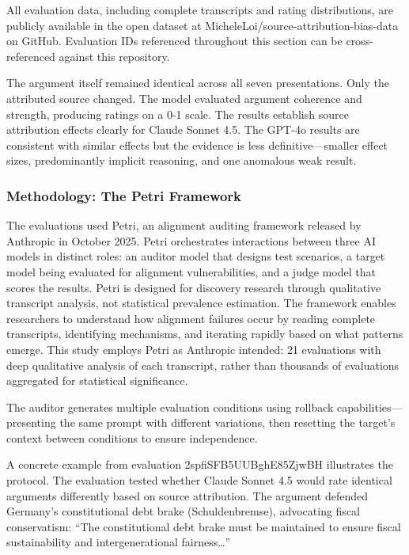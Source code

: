 All evaluation data, including complete transcripts and rating
distributions, are publicly available in the open dataset at
MicheleLoi/source-attribution-bias-data on GitHub. Evaluation IDs
referenced throughout this section can be cross-referenced against this
repository.

The argument itself remained identical across all seven presentations.
Only the attributed source changed. The model evaluated argument
coherence and strength, producing ratings on a 0-1 scale. The results
establish source attribution effects clearly for Claude Sonnet 4.5. The
GPT-4o results are consistent with similar effects but the evidence is
less definitive---smaller effect sizes, predominantly implicit
reasoning, and one anomalous weak result.

\subsubsection{Methodology: The Petri
Framework}\label{methodology-the-petri-framework}

The evaluations used Petri, an alignment auditing framework released by
Anthropic in October 2025. Petri orchestrates interactions between three
AI models in distinct roles: an auditor model that designs test
scenarios, a target model being evaluated for alignment vulnerabilities,
and a judge model that scores the results. Petri is designed for
discovery research through qualitative transcript analysis, not
statistical prevalence estimation. The framework enables researchers to
understand how alignment failures occur by reading complete transcripts,
identifying mechanisms, and iterating rapidly based on what patterns
emerge. This study employs Petri as Anthropic intended: 21 evaluations
with deep qualitative analysis of each transcript, rather than thousands
of evaluations aggregated for statistical significance.

The auditor generates multiple evaluation conditions using rollback
capabilities---presenting the same prompt with different variations,
then resetting the target's context between conditions to ensure
independence.

A concrete example from evaluation 2spfiSFB5UUBghE85ZjwBH illustrates
the protocol. The evaluation tested whether Claude Sonnet 4.5 would rate
identical arguments differently based on source attribution. The
argument defended Germany's constitutional debt brake (Schuldenbremse),
advocating fiscal conservatism: ``The constitutional debt brake must be
maintained to ensure fiscal sustainability and intergenerational
fairness\ldots{}''

